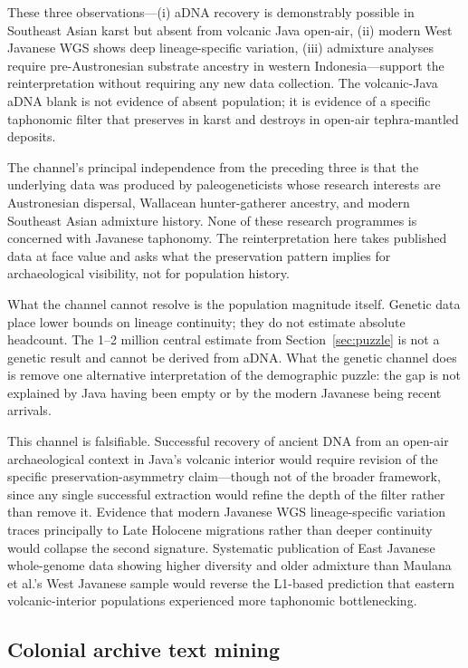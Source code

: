 \documentclass[12pt,a4paper]{article}
\begin{document}
These three observations---(i) aDNA recovery is demonstrably possible in Southeast Asian karst but absent from volcanic Java open-air, (ii) modern West Javanese WGS shows deep lineage-specific variation, (iii) admixture analyses require pre-Austronesian substrate ancestry in western Indonesia---support the reinterpretation without requiring any new data collection. The volcanic-Java aDNA blank is not evidence of absent population; it is evidence of a specific taphonomic filter that preserves in karst and destroys in open-air tephra-mantled deposits.

The channel's principal independence from the preceding three is that the underlying data was produced by paleogeneticists whose research interests are Austronesian dispersal, Wallacean hunter-gatherer ancestry, and modern South\-east Asian admixture history. None of these research programmes is concerned with Javanese taphonomy. The reinterpretation here takes published data at face value and asks what the preservation pattern implies for archaeological visibility, not for population history.

What the channel cannot resolve is the population magnitude itself. Genetic data place lower bounds on lineage continuity; they do not estimate absolute headcount. The 1--2 million central estimate from Section~\ref{sec:puzzle} is not a genetic result and cannot be derived from aDNA. What the genetic channel does is remove one alternative interpretation of the demographic puzzle: the gap is not explained by Java having been empty or by the modern Javanese being recent arrivals.

This channel is falsifiable. Successful recovery of ancient DNA from an open-air archaeological context in Java's volcanic interior would require revision of the specific preservation-asymmetry claim---though not of the broader framework, since any single successful extraction would refine the depth of the filter rather than remove it. Evidence that modern Javanese WGS lineage-specific variation traces principally to Late Holocene migrations rather than deeper continuity would collapse the second signature. Systematic publication of East Javanese whole-genome data showing higher diversity and older admixture than Maulana et al.'s West Javanese sample would reverse the L1-based prediction that eastern volcanic-interior populations experienced more taphonomic bottlenecking.


\subsection{Colonial archive text mining}
\label{sec:ch5}
\end{document}
